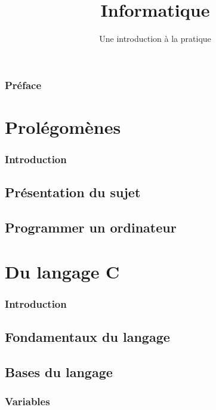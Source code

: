 \documentclass[french]{minitelreport}
\begin{document}
\title{Informatique}
\subtitle{Une introduction à la pratique}
\maketitle
\section*{Préface}

\tableofcontents
\listoftables
\listofdefinition
\newpage
\part{Prolégomènes}
	\section*{Introduction}
	
	\chapter{Présentation du sujet}
		
	\chapter{Programmer un ordinateur}
		
\part{Du langage C}
	\section*{Introduction}
	
	\chapter{Fondamentaux du langage}
		
	\chapter{Bases du langage}
		\section{Variables}
		
\end{document}
